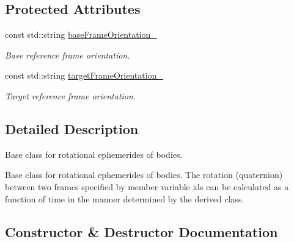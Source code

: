 \subsection*{Protected Attributes}
\begin{DoxyCompactItemize}
\item 
const std\+::string \hyperlink{classtudat_1_1ephemerides_1_1RotationalEphemeris_ae8cb8bf513d5c4088386333b7e071677}{base\+Frame\+Orientation\+\_\+}
\begin{DoxyCompactList}\small\item\em Base reference frame orientation. \end{DoxyCompactList}\item 
const std\+::string \hyperlink{classtudat_1_1ephemerides_1_1RotationalEphemeris_a113566bbf2ec56dc623466c98dab0454}{target\+Frame\+Orientation\+\_\+}
\begin{DoxyCompactList}\small\item\em Target reference frame orientation. \end{DoxyCompactList}\end{DoxyCompactItemize}


\subsection{Detailed Description}
Base class for rotational ephemerides of bodies. 

Base class for rotational ephemerides of bodies. The rotation (quaternion) between two frames specified by member variable ids can be calculated as a function of time in the manner determined by the derived class. 

\subsection{Constructor \& Destructor Documentation}
